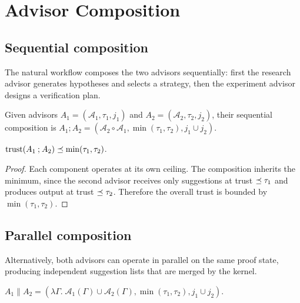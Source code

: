 \documentclass[11pt]{article}
\begin{document}
\section{Advisor Composition}\label{sec:composition}

\subsection{Sequential composition}

The natural workflow composes the two advisors sequentially:
first the research advisor generates hypotheses and selects
a strategy, then the experiment advisor designs a verification
plan.

\begin{definition}\label{def:seqcomp}
Given advisors $A_1 = (\mathcal{A}_1, \tau_1, j_1)$ and
$A_2 = (\mathcal{A}_2, \tau_2, j_2)$, their sequential
composition is $A_1 \mathbin{;} A_2 = (\mathcal{A}_2 \circ
\mathcal{A}_1, \min(\tau_1, \tau_2), j_1 \cup j_2)$.
\end{definition}

\begin{lemma}\label{lem:comptrust}
$\mathrm{trust}(A_1 \mathbin{;} A_2) \preceq
\min(\tau_1, \tau_2)$.
\end{lemma}
\begin{proof}
Each component operates at its own ceiling.  The composition
inherits the minimum, since the second advisor receives only
suggestions at trust $\preceq \tau_1$ and produces output at
trust $\preceq \tau_2$.  Therefore the overall trust is bounded
by $\min(\tau_1, \tau_2)$.
\end{proof}

\subsection{Parallel composition}

Alternatively, both advisors can operate in parallel on the
same proof state, producing independent suggestion lists
that are merged by the kernel.

\begin{definition}\label{def:parcomp}
$A_1 \| A_2 = (\lambda \Gamma.\;
\mathcal{A}_1(\Gamma) \cup \mathcal{A}_2(\Gamma),
\min(\tau_1, \tau_2), j_1 \cup j_2)$.
\end{definition}
\end{document}
